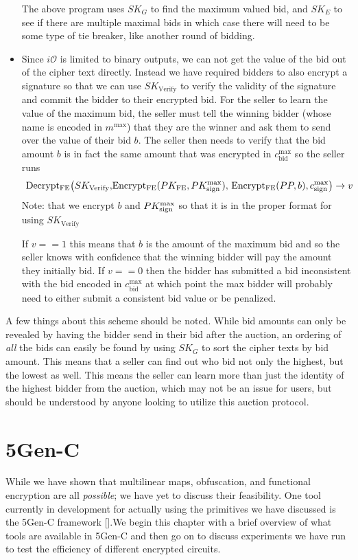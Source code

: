 \documentclass[12pt,twoside]{reedthesis}
\begin{document}
\begin{itemize}
	The above program uses $SK_G$ to find the maximum valued bid, and $SK_E$ to see if there are multiple maximal bids in which case there will need to be some type of tie breaker, like another round of bidding. 
	\item Since $i\mathcal{O}$ is limited to binary outputs, we can not get the value of the bid out of the cipher text directly. Instead we have required bidders to also encrypt a signature so that we can use $SK_\text{Verify}$ to verify the validity of the signature and commit the bidder to their encrypted bid. For the seller to learn the value of the maximum bid, the seller must tell the winning bidder (whose name is encoded in $m^\text{max}$) that they are the winner and ask them to send over the value of their bid $b$. The seller then needs to verify that the bid amount $b$ is in fact the same amount that was encrypted in $c^\text{max}_\text{bid}$ so the seller runs $$\text{ Decrypt$_\text{FE}\big(SK_\text{Verify},$Encrypt$_\text{FE}(PK_\text{FE},PK_\text{sign}^\text{max}),$ Encrypt$_\text{FE}(PP, b),c_\text{sign}^\text{max}$\big)} \to v $$
Note: that we encrypt $b$ and $PK_\text{sign}^\text{max}$ so that it is in the proper format for using $SK_\text{Verify}$

\par If $v==1$ this means that $b$ is the amount of the maximum bid and so the seller knows with confidence that the winning bidder will pay the amount they initially bid. If $v == 0$ then the bidder has submitted a bid inconsistent with the bid encoded in $c_\text{bid}^\text{max}$ at which point the max bidder will probably need to either submit a consistent bid value or be penalized.
       \end{itemize}
       
       \par A few things about this scheme should be noted. While bid amounts can only be revealed by having the bidder send in their bid after the auction, an ordering of \textit{all} the bids can easily be found by using $SK_G$ to sort the cipher texts by bid amount. This means that a seller can find out who bid not only the highest, but the lowest as well. This means the seller can learn more than just the identity of the highest bidder from the auction, which may not be an issue for users, but should be understood by anyone looking to utilize this auction protocol.    
    
    
    
    
    
    \chapter{5Gen-C}
    \par While we have shown that multilinear maps, obfuscation, and functional encryption are all \textit{possible}; we have yet to discuss their feasibility. One tool currently in development for actually using the primitives we have discussed is the 5Gen-C framework [\cite{5genc}].We begin this chapter with a brief overview of what tools are available in 5Gen-C and then go on to discuss experiments we have run to test the efficiency of different encrypted circuits. 
    
\end{document}

